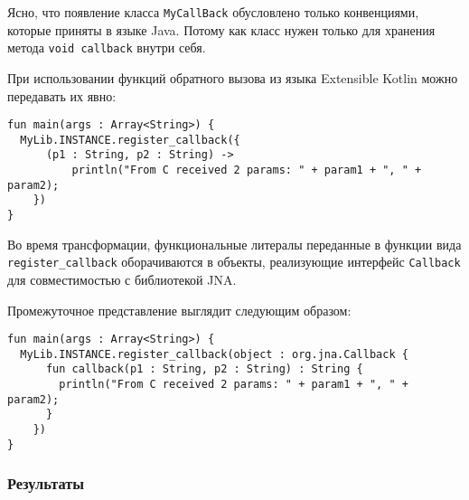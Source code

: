 Ясно, что появление класса \texttt{MyCallBack} обусловлено только конвенциями, которые приняты в языке Java. Потому как класс нужен только для хранения метода \texttt{void callback} внутри себя.

При использовании функций обратного вызова из языка Extensible Kotlin можно передавать их явно:
\begin{lstlisting}
fun main(args : Array<String>) {
  MyLib.INSTANCE.register_callback({
      (p1 : String, p2 : String) -> 
          println("From C received 2 params: " + param1 + ", " + param2);
    })
}
\end{lstlisting}

Во время трансформации, функциональные литералы переданные в функции вида \texttt{register\_callback} оборачиваются в объекты, реализующие интерфейс \texttt{Callback} для совместимостью с библиотекой JNA.

Промежуточное представление выглядит следующим образом:
\begin{lstlisting}
fun main(args : Array<String>) {
  MyLib.INSTANCE.register_callback(object : org.jna.Callback {
      fun callback(p1 : String, p2 : String) : String {
        println("From C received 2 params: " + param1 + ", " + param2);
      }
    })
}
\end{lstlisting}

\subsubsection{Результаты}